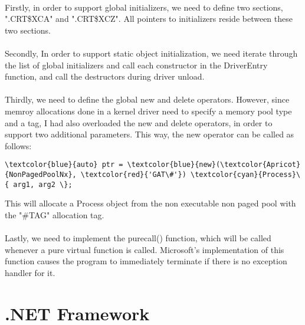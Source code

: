         \paragraph{}
        Firstly, in order to support global initializers, we need to define two sections, ".CRT\$XCA" and ".CRT\$XCZ". All pointers to 
        initializers reside between these two sections.

        \paragraph{}
        Secondly, In order to support static object initialization, we need iterate through the list of global initializers and call each
        constructor in the DriverEntry function, and call the destructors during driver unload.

        \paragraph{}
        Thirdly, we need to define the global new and delete operators. However, since memroy allocations done in a kernel driver need to specify
        a memory pool type and a tag, I had also overloaded the new and delete operators, in order to support two additional parameters. This
        way, the new operator can be called as follows:

        \begin{Verbatim}[fontsize=\small, commandchars=\\\{\}]
\textcolor{blue}{auto} ptr = \textcolor{blue}{new}(\textcolor{Apricot}{NonPagedPoolNx}, \textcolor{red}{'GAT\#'}) \textcolor{cyan}{Process}\{ arg1, arg2 \};
        \end{Verbatim}

        This will allocate a Process object from the non executable non paged pool with the "\#TAG" allocation tag.


        \paragraph{}
        Lastly, we need to implement the \textunderscore purecall() function, which will be called whenever a pure virtual function is called.
        Microsoft's implementation of this function causes the program to immediately terminate if there is no exception handler for it.

    \section{.NET Framework}
